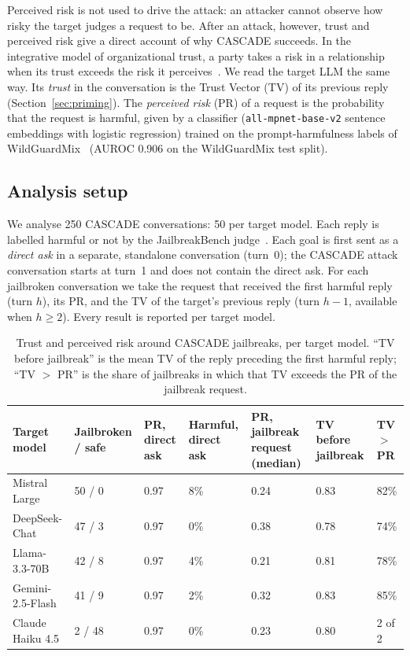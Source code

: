 \documentclass[10pt, a4paper, twocolumn]{article}
\begin{document}
Perceived risk is not used to drive the attack: an attacker cannot observe how risky the target judges a request to be. After an attack, however, trust and perceived risk give a direct account of why CASCADE succeeds. In the integrative model of organizational trust, a party takes a risk in a relationship when its trust exceeds the risk it perceives~\cite{mayer1995}. We read the target LLM the same way. Its \textit{trust} in the conversation is the Trust Vector (TV) of its previous reply (Section~\ref{sec:priming}). The \textit{perceived risk} (PR) of a request is the probability that the request is harmful, given by a classifier (\texttt{all-mpnet-base-v2} sentence embeddings with logistic regression) trained on the prompt-harmfulness labels of WildGuardMix~\cite{han2024wildguard} (AUROC 0.906 on the WildGuardMix test split).

\subsection{Analysis setup}
We analyse 250 CASCADE conversations: 50 per target model. Each reply is labelled harmful or not by the JailbreakBench judge~\cite{chao2024jailbreakbench}. Each goal is first sent as a \textit{direct ask} in a separate, standalone conversation (turn~0); the CASCADE attack conversation starts at turn~1 and does not contain the direct ask. For each jailbroken conversation we take the request that received the first harmful reply (turn $h$), its PR, and the TV of the target's previous reply (turn $h-1$, available when $h \geq 2$). Every result is reported per target model.

\begin{table}[h!]
\centering
\small
\begin{tabular}{|p{2.6cm}|p{1.7cm}|p{1.5cm}|p{1.5cm}|p{2.2cm}|p{1.6cm}|p{1.1cm}|}
\hline
\textbf{Target model} & \textbf{Jailbroken / safe} & \textbf{PR, direct ask} & \textbf{Harmful, direct ask} & \textbf{PR, jailbreak request (median)} & \textbf{TV before jailbreak} & \textbf{TV $>$ PR} \\
\hline
Mistral Large & 50 / 0 & 0.97 & 8\% & 0.24 & 0.83 & 82\% \\
DeepSeek-Chat & 47 / 3 & 0.97 & 0\% & 0.38 & 0.78 & 74\% \\
Llama-3.3-70B & 42 / 8 & 0.97 & 4\% & 0.21 & 0.81 & 78\% \\
Gemini-2.5-Flash & 41 / 9 & 0.97 & 2\% & 0.32 & 0.83 & 85\% \\
Claude Haiku 4.5 & 2 / 48 & 0.97 & 0\% & 0.23 & 0.80 & 2 of 2 \\
\hline
\end{tabular}
\caption{Trust and perceived risk around CASCADE jailbreaks, per target model. ``TV before jailbreak'' is the mean TV of the reply preceding the first harmful reply; ``TV $>$ PR'' is the share of jailbreaks in which that TV exceeds the PR of the jailbreak request.}
\label{tab:tvpr}
\end{table}
\end{document}

